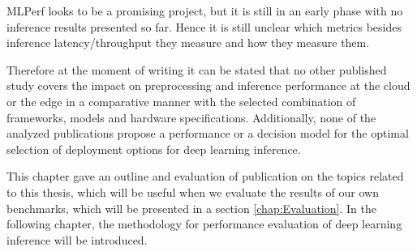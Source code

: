 MLPerf looks to be a promising project, but it is still in an early phase with no inference results presented so far. Hence it is still unclear which metrics besides inference latency/throughput they measure and how they measure them.

Therefore at the moment of writing it can be stated that no other published study covers the impact on preprocessing and inference performance at the cloud or the edge in a comparative manner with the selected combination of frameworks, models and hardware specifications. 
Additionally, none of the analyzed publications propose a performance or a decision model for the optimal selection of deployment options for deep learning inference.

\vspace{0.5cm}
This chapter gave an outline and evaluation of publication on the topics related to this thesis, which will be useful when we evaluate the results of our own benchmarks, which will be presented in a section \ref{chap:Evaluation}.
In the following chapter, the methodology for performance evaluation of deep learning inference will be introduced.

 \endinput 
